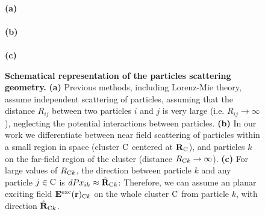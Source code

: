 \begin{figure}[h!]
	\centering
	\def\svgwidth{.5\textwidth}
	 \\ [8pt]  
	\textbf{(a)} \\
	\def\svgwidth{.5\textwidth}
	 \\ [-5pt]
	\textbf{(b)} \\ [5pt]
	\def\svgwidth{.5\textwidth}
	 \\ [-5pt]
	\textbf{(c)}
	
	\caption[Schematical representation of the particles scattering geometry]{\label{fig:waveoptics:diagram}
	  	\textbf{Schematical representation of the particles scattering geometry.} \textbf{(a)} Previous methods, including Lorenz-Mie theory, assume independent scattering of particles, assuming that the distance $R_{ij}$ between two particles $i$ and $j$ is very large (i.e. $R_{ij}\rightarrow\infty$), neglecting the potential interactions between particles. \textbf{(b)} In our work  we differentiate between near field scattering of particles within a small region in space (cluster $\mathrm{C}$ centered at $\mathbf{R}_{\mathrm{C}}$), and particles $k$ on the far-field region of the cluster (distance $R_{\mathrm{C} k}\rightarrow\infty$). \textbf{(c)} For large values of $R_{\mathrm{C} k}$, the direction between particle $k$ and any particle $j\in\mathrm{C}$ is $dPx_{ik}\approx\hat{\mathbf{R}}_{\mathrm{C} k}$: Therefore, we can assume an planar exciting field $\mathbf{E}^\mathrm{exc}(\mathbf{r})_{\mathrm{C} k}$ on the whole cluster $\mathrm{C}$ from particle $k$, with direction $\hat{\mathbf{R}}_{\mathrm{C} k}$. 
	}
\end{figure}